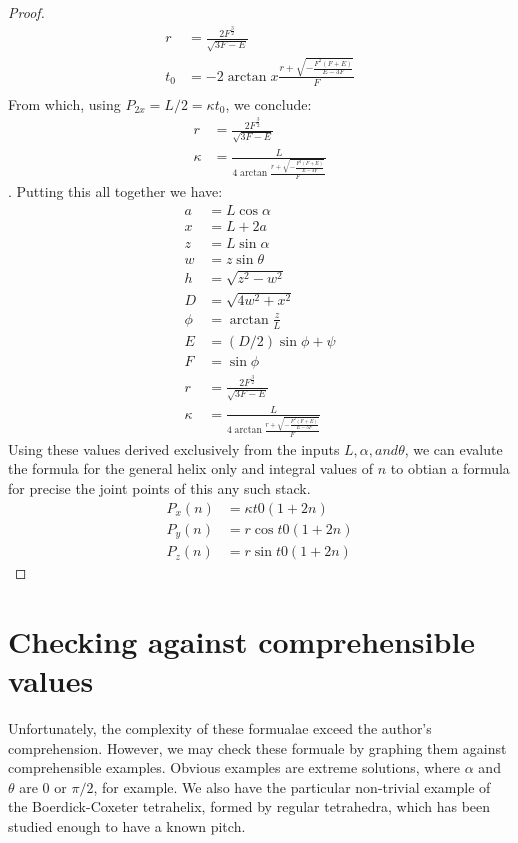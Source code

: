 \documentclass[11pt]{article}
\begin{document}
{\begin{proof}
  
  \begin{align*}  
    r &= \frac{2F^{\frac{3}{2}}}{\sqrt{3F - E}} \\
    t_0 &= -2 \arctan{x}
      \frac{r +
        \sqrt{- \frac{F^2(F+E)}{E-3F}
        }
      }
           {F}
     \\
  \end{align*}
  From which, using $P_{2x} = L/2 = \kappa t_0$, we conclude:
  \begin{align*}  
    r &= \frac{2F^{\frac{3}{2}}}{\sqrt{3F - E}} \\
    \kappa &= \frac{L}{4 \arctan{\frac{r + \sqrt{- \frac{F^2(F+E)}{E-3F}}}{F}}}
  \end{align*}.
  Putting this all together we have:
  \begin{align*}
    a &= L \cos{\alpha} \\
    x &= L + 2a \\
    z &= L \sin{\alpha} \\
    w &= z \sin{\theta} \\
    h &= \sqrt{z^2 - w^2} \\
    D &= \sqrt{4w^2+x^2} \\
    \phi &= \arctan{\frac{z}{L}} \\
    E &= (D/2) \sin{\phi + \psi} \\
    F &= \sin{\phi} \\
    r &= \frac{2F^{\frac{3}{2}}}{\sqrt{3F - E}} \\
    \kappa &= \frac{L}{4 \arctan{\frac{r + \sqrt{- \frac{F^2(F+E)}{E-3F}}}{F}}}
  \end{align*}
  Using these values derived exclusively from the inputs $L,\alpha, and \theta$, we can
  evalute the formula for the general helix only and integral values of $n$ to
  obtian a formula for precise the joint points of this any such stack.
\begin{align*}
    P_x(n) &= \kappa  t0 (1 + 2n)  \\
    P_y(n) &= r \cos{t0 (1 + 2n)} \\
    P_z(n) &= r \sin{t0 (1 + 2n)}
\end{align*}

\end{proof}

\section{Checking against comprehensible values}

Unfortunately, the complexity of these formualae exceed the author's comprehension.
However, we may check these formuale by graphing them against comprehensible
examples. Obvious examples are extreme solutions, where $\alpha$  and $\theta$ are
$0$ or $\pi/2$, for example. We also have the particular non-trivial example
of the Boerdick-Coxeter tetrahelix, formed by regular tetrahedra, which has
been studied enough to have a known pitch.



}
\end{document}
